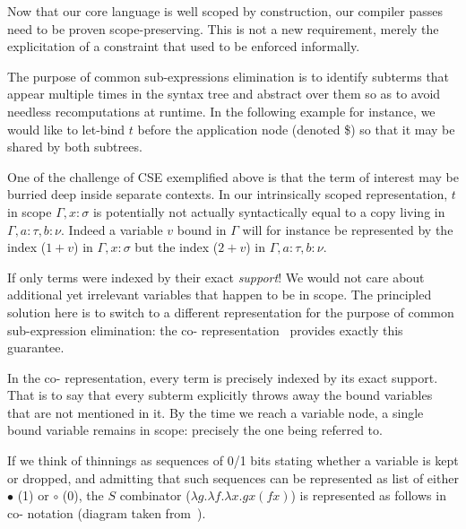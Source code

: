 

Now that our core language is well scoped by construction, our compiler passes
need to be proven scope-preserving.
%
This is not a new requirement, merely the explicitation of a constraint that
used to be enforced informally.


The purpose of common sub-expressions elimination is to identify subterms
that appear multiple times in the syntax tree and abstract over them so
as to avoid needless recomputations at runtime.
%
In the following example for instance, we would like to let-bind $t$ before
the application node (denoted \$) so that it may be shared by both subtrees.

\cseexamplegraph{}

One of the challenge of CSE exemplified above is that the term of interest
may be burried deep inside separate contexts. In our intrinsically scoped
representation, $t$ in scope $\Gamma, x : \sigma$ is potentially not actually
syntactically equal to a copy living in $\Gamma, a : \tau, b : \nu$.
%
Indeed a variable $v$ bound in $\Gamma$ will for instance be represented by
the \DeBruijn{} index ($1+v$) in $\Gamma, x : \sigma$
but the index ($2+v$) in $\Gamma, a :  \tau, b : \nu$.

If only terms were indexed by their exact \emph{support}! We would not care
about additional yet irrelevant variables that happen to be in scope.
%
The principled solution here is to switch to a different representation for
the purpose of common sub-expression elimination: the co-\DeBruijn{}
representation~\cite{DBLP:journals/corr/abs-1807-04085} provides exactly this guarantee.


In the co-\DeBruijn{} representation, every term is precisely indexed by its
exact support.
%
That is to say that every subterm explicitly throws away the bound variables
that are not mentioned in it.
%
By the time we reach a variable node, a single  bound variable remains in scope:
precisely the one being referred to.

If we think of thinnings as sequences of 0/1 bits stating whether a variable
is kept or dropped, and admitting that such sequences can be represented as
list of either $\bullet$ (1) or $\circ$ (0), the $S$ combinator
($\lambda g. \lambda f. \lambda x. g x (f x)$) is represented as follows in
co-\DeBruijn{} notation (diagram taken from~\cite{MANUAL:draft/Allais22}).

